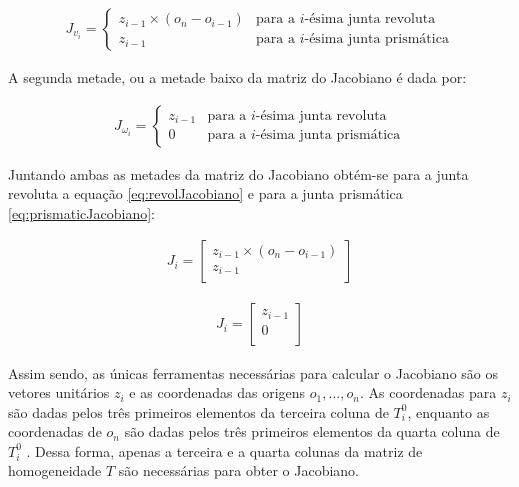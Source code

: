 \begin{equation}
  \begin{gathered}
    J_{v_i} = 
      \left\{
	\begin{array}{cl}
	  z_{i-1} \times (o_n - o_{i-1}) & \text{para a $i$-ésima junta revoluta}\\
	  z_{i-1} 			 & \text{para a $i$-ésima junta prismática}
	\end{array}
      \right.
  \end{gathered}
\end{equation}

A segunda metade, ou a metade baixo da matriz do Jacobiano é dada por:

\begin{equation}
  \begin{gathered}
    J_{\omega_i} = 
      \left\{
	\begin{array}{cl}
	  z_{i-1} & \text{para a $i$-ésima junta revoluta}\\
	  0 	  & \text{para a $i$-ésima junta prismática}
	\end{array}
      \right.
  \end{gathered}
\end{equation}

Juntando ambas as metades da matriz do Jacobiano obtém-se para a junta revoluta a equação \eqref{eq:revolJacobiano}
e para a junta prismática \eqref{eq:prismaticJacobiano}:

\begin{equation}
  \begin{gathered}
    J_i = \begin{bmatrix}
     z_{i-1} \times (o_n - o_{i-1})\\
     z_{i-1}\\
    \end{bmatrix}
  \end{gathered}
  \label{eq:revolJacobiano}
\end{equation}

\begin{equation}
  \begin{gathered}
    J_i = \begin{bmatrix}
     z_{i-1}\\
     0\\
    \end{bmatrix}
  \end{gathered}
  \label{eq:prismaticJacobiano}
\end{equation}

Assim sendo, as únicas ferramentas necessárias para calcular o Jacobiano são os 
vetores unitários $z_i$ e as coordenadas das origens $o_1, ..., o_n$. As coordenadas
para $z_i$ são dadas pelos três primeiros elementos da terceira coluna de $T^0_i$, 
enquanto as coordenadas de $o_n$ são dadas pelos três primeiros elementos da quarta
coluna de $T^0_i$ . Dessa forma, apenas a terceira e a quarta colunas da matriz de 
homogeneidade $T$ são necessárias para obter o Jacobiano. \cite{Spong}

